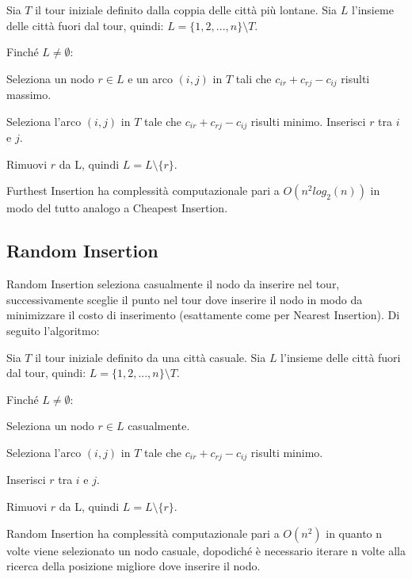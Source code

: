 \documentclass[a4paper,12pt]{report}
\begin{document}
\begin{legal}
  \item Sia $T$ il tour iniziale definito dalla coppia delle città più lontane. Sia $L$ l'insieme delle città fuori dal tour, quindi: $L = \{1, 2, ..., n\} \setminus T$.
  \item Finché $L \neq \emptyset$:
  \begin{legal}
    \item Seleziona un nodo $r \in L$ e un arco $(i, j)$ in $T$ tali che $c_{ir} + c_{rj} - c_{ij}$ risulti massimo.
    \item Seleziona l'arco $(i, j)$ in $T$ tale che $c_{ir} + c_{rj} - c_{ij}$ risulti minimo. Inserisci $r$ tra $i$ e $j$.  
    \item Rimuovi $r$ da L, quindi $L = L \setminus \{r\}$.
  \end{legal}
\end{legal}
\hfill \break Furthest Insertion ha complessità computazionale pari a $O(n^2 log_2(n))$ in modo del tutto analogo a Cheapest Insertion.

\subsection{Random Insertion}
Random Insertion seleziona casualmente il nodo da inserire nel tour, successivamente sceglie il punto nel tour dove inserire il nodo in modo da minimizzare il costo di inserimento (esattamente come per Nearest Insertion). Di seguito l'algoritmo:

\begin{legal}
  \item Sia $T$ il tour iniziale definito da una città casuale. Sia $L$ l'insieme delle città fuori dal tour, quindi: $L = \{1, 2, ..., n\} \setminus T$.
  \item Finché $L \neq \emptyset$:
  \begin{legal}
    \item Seleziona un nodo $r \in L$ casualmente.
    \item Seleziona l'arco $(i, j)$ in $T$ tale che $c_{ir} + c_{rj} - c_{ij}$ risulti minimo.
    \item Inserisci $r$ tra $i$ e $j$.  
    \item Rimuovi $r$ da L, quindi $L = L \setminus \{r\}$.
  \end{legal}
\end{legal}
\hfill \break Random Insertion ha complessità computazionale pari a $O(n^2)$ in quanto n volte viene selezionato un nodo casuale, dopodiché è necessario iterare n volte alla ricerca della posizione migliore dove inserire il nodo.
\end{document}
